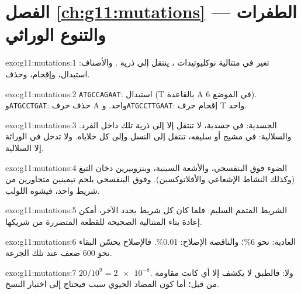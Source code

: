 \section*{الفصل \ref{ch:g11:mutations} --- الطفرات والتنوع الوراثي}

\begin{solution}{exo:g11:mutations:1}
تغير في متتالية نوكليوتيدات ، ينتقل إلى ذرية . والأصناف:
استبدال، وإقحام، وحذف.
\end{solution}

\begin{solution}{exo:g11:mutations:2}
\texttt{ATGCCAGAAT}: استبدال (T بالقاعدة A في الموضع 6).
و\texttt{ATGCCTGAT}: حذف حرف A واحد. و\texttt{ATGCCTTGAAT}: إقحام
حرف T واحد.
\end{solution}

\begin{solution}{exo:g11:mutations:3}
الجسدية: في  جسدية، لا تنتقل إلا إلى ذرية تلك  داخل الفرد.
والسلالية: في مشيج أو سليفه، تنتقل إلى النسل وإلى كل خلاياه. ولا تدخل
في الوراثة إلا  السلالية.
\end{solution}

\begin{solution}{exo:g11:mutations:4}
الضوء فوق البنفسجي، والأشعة السينية، وبنزوبيرين دخان التبغ (وكذلك
النشاط الإشعاعي والأفلاتوكسين). وفوق البنفسجي يلحم تيمينين متجاورين من
شريط واحد، فيشوه اللولب.
\end{solution}

\begin{solution}{exo:g11:mutations:5}
الشريط المتمم السليم: فلما كان كل شريط يحدد الآخر، أمكن إعادة بناء
المتتالية الصحيحة للقطعة المتضررة من شريكها.
\end{solution}

\begin{solution}{exo:g11:mutations:6}
العادية: نحو 6\%؛ والناقصة الإصلاح: 0.01\%. فالإصلاح يحسّن البقاء نحو
600 ضعف عند تلك الجرعة.
\end{solution}

\begin{solution}{exo:g11:mutations:7}
$20/10^9 = \num{2e-8}$. ولا: فالطبق لا يكشف إلا أي  كانت
مقاومة من قبل؛ أما كون المضاد الحيوي سبب  فيحتاج إلى اختبار
النسخ.
\end{solution}

